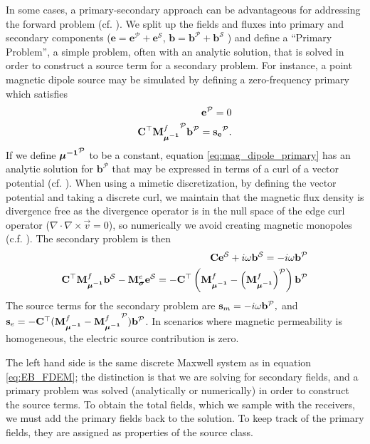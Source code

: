 In some cases, a primary-secondary approach can be advantageous for addressing
the forward problem (cf. \cite{Coggon1971, Haber2014a, Heagy2015}). We split up the fields
and fluxes into primary and secondary components ($\mathbf{e} =
\mathbf{e}^\mathcal{P} + \mathbf{e}^\mathcal{S}$, $\mathbf{b} =
\mathbf{b}^\mathcal{P} + \mathbf{b}^\mathcal{S}$ ) and define a ``Primary
Problem'', a simple problem, often with an analytic solution, that is solved
in order to construct a source term for a secondary problem. For instance, a
point magnetic dipole source may be simulated by defining a zero-frequency
primary which satisfies
\begin{equation}
\begin{split}
    \mathbf{e}^\mathcal{P} = 0 \\
           {\mathbf C}^\top {{\mathbf M}^f_{\boldsymbol{\mu^{-1}}}}^\mathcal{P} \mathbf{b}^\mathcal{P} = \mathbf{s_e}^\mathcal{P}.
\end{split}
\label{eq:mag_dipole_primary}
\end{equation}
If we define $\boldsymbol{\mu^{-1}}^\mathcal{P}$ to be a constant, equation
\ref{eq:mag_dipole_primary} has an analytic solution for
$\mathbf{b}^\mathcal{P}$ that may be expressed in terms of a curl of a vector
potential (cf. \cite{Griffiths2007}). When using a mimetic discretization, by
defining the vector potential and taking a discrete curl, we maintain that the
magnetic flux density is divergence free as the divergence operator is in the
null space of the edge curl operator ($\nabla \cdot \nabla \times \vec{v} = 0$), so
numerically we avoid creating magnetic monopoles (c.f. \cite{Haber2014a}). The
secondary problem is then
\begin{equation}
\begin{split}
{\mathbf C} \mathbf{e}^\mathcal{S} + i \omega \mathbf{b}^\mathcal{S} = - i \omega \mathbf{b}^\mathcal{P} \\
{\mathbf C}^\top {{\mathbf M}^f_{\boldsymbol{\mu^{-1}}}} \mathbf{b}^\mathcal{S} - {{\mathbf M}^e_{\boldsymbol{\sigma}}} \mathbf{e}^\mathcal{S} = -{\mathbf C}^\top \left({{\mathbf M}^f_{\boldsymbol{\mu^{-1}}}}-\left({{\mathbf M}^f_{\boldsymbol{\mu^{-1}}}}\right)^\mathcal{P}\right)\mathbf{b}^\mathcal{P}
\label{eq:primsecmagdipole}
\end{split}
\end{equation}
The source terms for the secondary problem are $\mathbf{s}_m = -i \omega
\mathbf{b}^\mathcal{P},$ and $\mathbf{s}_e = -{\mathbf C}^\top ({{\mathbf M}^f_{\boldsymbol{\mu^{-1}}}}-{{\mathbf M}^f_{\boldsymbol{\mu^{-1}}}}^\mathcal{P})
\mathbf{b}^\mathcal{P}$. In scenarios where magnetic permeability is homogeneous,
the electric source contribution is zero.

The left hand side is the same discrete Maxwell system as in equation \ref{eq:EB_FDEM};
the  distinction is that we are solving for secondary fields, and a primary
problem was solved (analytically or numerically) in order to construct the
source terms. To obtain the total fields, which we sample with the receivers,
we must add the primary fields back to the solution. To keep track of the
primary fields, they are assigned as properties of the source class.


